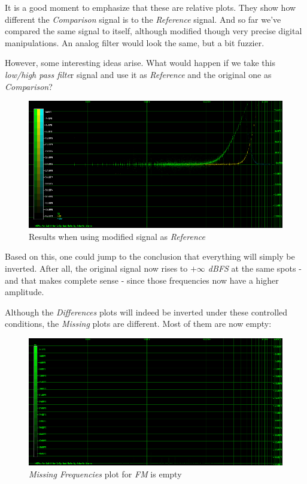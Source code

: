 \documentclass[10pt,a4paper]{report}
\begin{document}
It is a good moment to emphasize that these are relative plots. They show how different the \textit{Comparison} signal is to the \textit{Reference} signal. And so far we've compared the same signal to itself, although modified though very precise digital manipulations. An analog filter would look the same, but a bit fuzzier. 

However, some interesting ideas arise. What would happen if we take this \textit{low/high pass filte}r signal and use it as \textit{Reference} and the original one as \textit{Comparison}?

\begin{figure}[H]
	\centering
	\includegraphics[width=1.0\linewidth]{images/interpretation/Plot4-7-Reversed.png}
	\caption[Reversed]{Results when using modified signal as \textit{Reference}}
	\label{fig:plot4-7-reversed}
\end{figure}

Based on this, one could jump to the conclusion that everything will simply be inverted. After all, the original signal now rises to \textit{$+\infty$ dBFS} at the same spots - and that makes complete sense -  since those frequencies now have a higher amplitude. 

Although the \textit{Differences} plots will indeed be inverted under these controlled conditions, the \textit{Missing} plots are different. Most of them are now empty:

\begin{figure}[H]
	\centering
	\includegraphics[width=1.0\linewidth]{images/interpretation/Plot4-8-Missing-FM-Inverted.png}
	\caption[Reversed FM Missing]{\textit{Missing Frequencies} plot for \textit{FM} is empty}
	\label{fig:plot4-8-missing-fm-inverted}
\end{figure}
\end{document}
